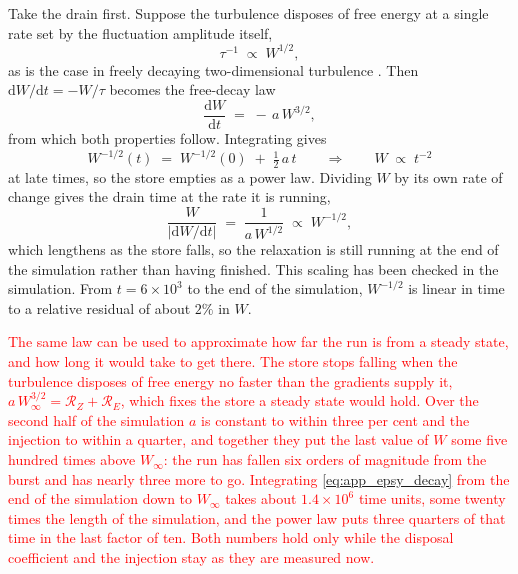 \documentclass{jpp}
\newcommand{\rmd}{\text{d}}
\begin{document}
Take the drain first. Suppose the turbulence disposes of free energy at a single rate set by the fluctuation amplitude itself,
\begin{equation}\label{eq:app_epsy_rate}
\tau^{-1} \;\propto\; W^{1/2} ,
\end{equation}
as is the case in freely decaying two-dimensional turbulence \citep{Batchelor1969}. Then $\rmd W/\rmd t = -W/\tau$ becomes the free-decay law
\begin{equation}\label{eq:app_epsy_decay}
\frac{\rmd W}{\rmd t} \;=\; -\,a\,W^{3/2} ,
\end{equation}
from which both properties follow. Integrating gives
\begin{equation}\label{eq:app_epsy_integrated}
W^{-1/2}(t) \;=\; W^{-1/2}(0) \;+\; \tfrac{1}{2}\,a\,t
\qquad\Longrightarrow\qquad
W \;\propto\; t^{-2}
\end{equation}
at late times, so the store empties as a power law. Dividing $W$ by its own rate of change gives the drain time at the rate it is running,
\begin{equation}\label{eq:app_epsy_tau}
\frac{W}{|\rmd W/\rmd t|} \;=\; \frac{1}{a\,W^{1/2}} \;\propto\; W^{-1/2} ,
\end{equation}
which lengthens as the store falls, so the relaxation is still running at the end of the simulation rather than having finished. This scaling has been checked in the simulation. From $t = 6\times10^{3}$ to the end of the simulation, $W^{-1/2}$ is linear in time to a relative residual of about $2\%$ in $W$.

\textcolor{red}{The same law can be used to approximate how far the run is from a steady state, and how long it would take to get there. The store stops falling when the turbulence disposes of free energy no faster than the gradients supply it, $a\,W_\infty^{3/2} = \mathcal{R}_Z + \mathcal{R}_E$, which fixes the store a steady state would hold. Over the second half of the simulation $a$ is constant to within three per cent and the injection to within a quarter, and together they put the last value of $W$ some five hundred times above $W_\infty$: the run has fallen six orders of magnitude from the burst and has nearly three more to go. Integrating \cref{eq:app_epsy_decay} from the end of the simulation down to $W_\infty$ takes about $1.4\times10^{6}$ time units, some twenty times the length of the simulation, and the power law puts three quarters of that time in the last factor of ten. Both numbers hold only while the disposal coefficient and the injection stay as they are measured now.}
\end{document}
